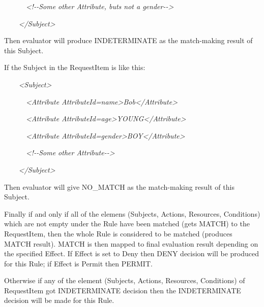 \documentclass{article}
\begin{document}
{\color{black}
\textit{\ \ \ \ \ \ }\textit{{\textless}!-{}-Some other Attribute, buts
not a {\textquotedbl}gender{\textquotedbl}-{}-{\textgreater}}}

{\color{black}
\textit{\ \ \ \ }\textit{{\textless}/Subject{\textgreater}}}

{\upshape\color{black}
Then evaluator will produce INDETERMINATE as the match-making result of
this Subject.}

{\color{black}
If the Subject in the RequestItem is like this:}

{\color{black}
\textit{\ \ \ \ }\textit{{\textless}Subject{\textgreater}}}

{\color{black}
\textit{\ \ \ \ \ \ }\textit{{\textless}Attribute
AttributeId={\textquotedbl}name{\textquotedbl}{\textgreater}Bob{\textless}/Attribute{\textgreater}}}

{\color{black}
\textit{\ \ \ \ \ \ }\textit{{\textless}Attribute
AttributeId={\textquotedbl}age{\textgreater}YOUNG{\textless}/Attribute{\textgreater}}}

{\color{black}
\textit{\ \ \ \ \ \ }\textit{{\textless}Attribute
AttributeId={\textquotedbl}gender{\textquotedbl}{\textgreater}BOY{\textless}/Attribute{\textgreater}}}

{\color{black}
\textit{\ \ \ \ \ \ }\textit{{\textless}!-{}-Some other
Attribute-{}-{\textgreater}}}

{\color{black}
\textit{\ \ \ \ }\textit{{\textless}/Subject{\textgreater}}}

{\color{black}
Then evaluator will give NO\_MATCH as the match-making result of this
Subject.}

{\upshape\color{black}
Finally if and only if all of the elemens (Subjects, Actions, Resources,
Conditions) which are not empty under the Rule have been matched (gets
MATCH) to the RequestItem, then the whole Rule is considered to be
matched (produces MATCH result). MATCH is then mapped to final
evaluation result depending on the specified Effect. If Effect is set
to Deny then DENY decision will be produced for this Rule; if Effect is
Permit then PERMIT.}

{\color{black}
Otherwise if any of the element (Subjects, Actions, Resources,
Conditions) of RequestItem got INDETERMINATE decision then the
INDETERMINATE decision will be made for this Rule.}
\end{document}

